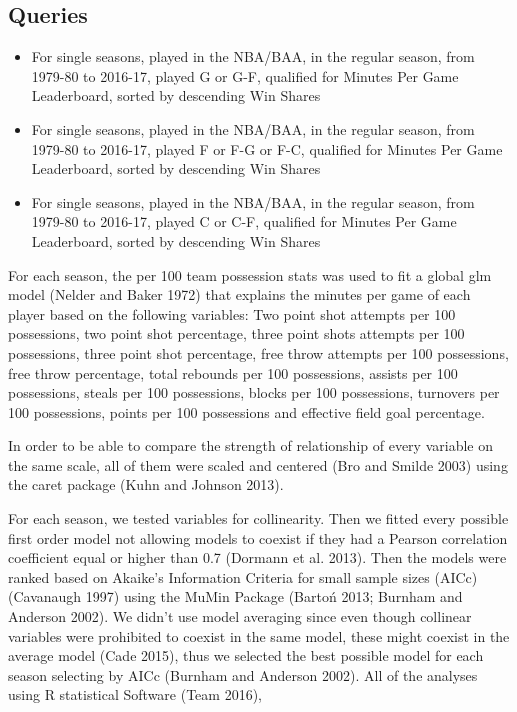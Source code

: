 \documentclass[]{elsarticle} %
\begin{document}
\subsection{Queries}\label{queries}

\begin{itemize}
\item
  For single seasons, played in the NBA/BAA, in the regular season, from
  1979-80 to 2016-17, played G or G-F, qualified for Minutes Per Game
  Leaderboard, sorted by descending Win Shares
\item
  For single seasons, played in the NBA/BAA, in the regular season, from
  1979-80 to 2016-17, played F or F-G or F-C, qualified for Minutes Per
  Game Leaderboard, sorted by descending Win Shares
\item
  For single seasons, played in the NBA/BAA, in the regular season, from
  1979-80 to 2016-17, played C or C-F, qualified for Minutes Per Game
  Leaderboard, sorted by descending Win Shares
\end{itemize}

For each season, the per 100 team possession stats was used to fit a
global glm model (Nelder and Baker 1972) that explains the minutes per
game of each player based on the following variables: Two point shot
attempts per 100 possessions, two point shot percentage, three point
shots attempts per 100 possessions, three point shot percentage, free
throw attempts per 100 possessions, free throw percentage, total
rebounds per 100 possessions, assists per 100 possessions, steals per
100 possessions, blocks per 100 possessions, turnovers per 100
possessions, points per 100 possessions and effective field goal
percentage.

In order to be able to compare the strength of relationship of every
variable on the same scale, all of them were scaled and centered (Bro
and Smilde 2003) using the caret package (Kuhn and Johnson 2013).

For each season, we tested variables for collinearity. Then we fitted
every possible first order model not allowing models to coexist if they
had a Pearson correlation coefficient equal or higher than 0.7 (Dormann
et al. 2013). Then the models were ranked based on Akaike's Information
Criteria for small sample sizes (AICc) (Cavanaugh 1997) using the MuMin
Package (Bartoń 2013; Burnham and Anderson 2002). We didn't use model
averaging since even though collinear variables were prohibited to
coexist in the same model, these might coexist in the average model
(Cade 2015), thus we selected the best possible model for each season
selecting by AICc (Burnham and Anderson 2002). All of the analyses using
R statistical Software (Team 2016),
\end{document}
